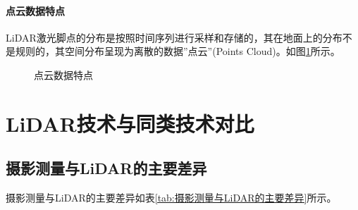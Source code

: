 \paragraph{点云数据特点}LiDAR激光脚点的分布是按照时间序列进行采样和存储的，其在地面上的分布不是规则的，其空间分布呈现为离散的数据”点云”(Points Cloud)。如图\ref{fig:点云数据特点}所示。
\begin{figure}[htbp]
	\centering
	 \quad
	\caption{点云数据特点}
	\label{fig:点云数据特点}
\end{figure}

\section{LiDAR技术与同类技术对比}
\subsection{摄影测量与LiDAR的主要差异}
摄影测量与LiDAR的主要差异如表\ref{tab:摄影测量与LiDAR的主要差异}所示。



